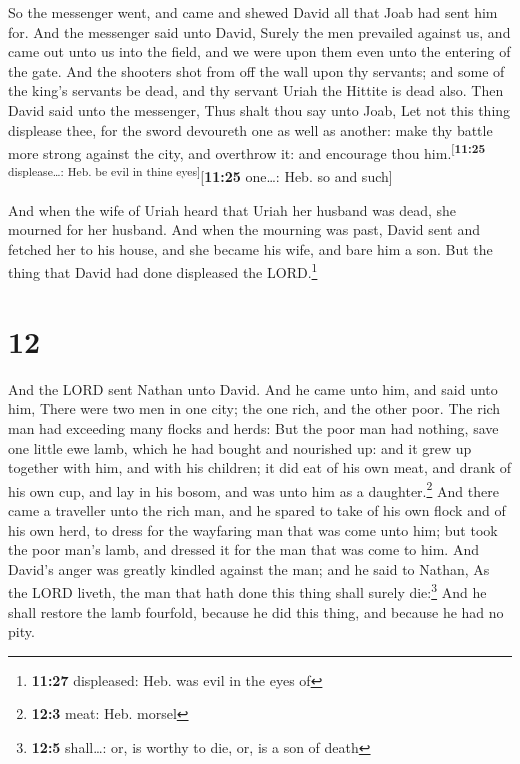  So the messenger went, and came and shewed David all
that Joab had sent him for.  And the messenger said unto
David, Surely the men prevailed against us, and came out unto us into
the field, and we were upon them even unto the entering of the gate.
 And the shooters shot from off the wall upon thy
servants; and some of the king's servants be dead, and thy servant Uriah
the Hittite is dead also.  Then David said unto the
messenger, Thus shalt thou say unto Joab, Let not this thing displease
thee, for the sword devoureth one as well as another: make thy battle
more strong against the city, and overthrow it: and encourage thou
him.\textsuperscript{{[}\textbf{11:25} displease\ldots: Heb. be evil in
thine eyes{]}}{[}\textbf{11:25} one\ldots: Heb. so and such{]}

 And when the wife of Uriah heard that Uriah her husband
was dead, she mourned for her husband.  And when the
mourning was past, David sent and fetched her to his house, and she
became his wife, and bare him a son. But the thing that David had done
displeased the LORD.\footnote{\textbf{11:27} displeased: Heb. was evil
  in the eyes of}

\hypertarget{section-11}{%
\section{12}\label{section-11}}

 And the LORD sent Nathan unto David. And he came unto
him, and said unto him, There were two men in one city; the one rich,
and the other poor.  The rich man had exceeding many
flocks and herds:  But the poor man had nothing, save one
little ewe lamb, which he had bought and nourished up: and it grew up
together with him, and with his children; it did eat of his own meat,
and drank of his own cup, and lay in his bosom, and was unto him as a
daughter.\footnote{\textbf{12:3} meat: Heb. morsel}  And
there came a traveller unto the rich man, and he spared to take of his
own flock and of his own herd, to dress for the wayfaring man that was
come unto him; but took the poor man's lamb, and dressed it for the man
that was come to him.  And David's anger was greatly
kindled against the man; and he said to Nathan, As the LORD liveth, the
man that hath done this thing shall surely die:\footnote{\textbf{12:5}
  shall\ldots: or, is worthy to die, or, is a son of death}
 And he shall restore the lamb fourfold, because he did
this thing, and because he had no pity.


